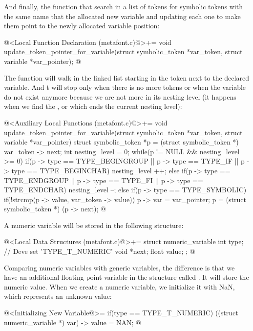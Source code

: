 And finally, the function that search in a list of tokens for symbolic
tokens with the same name that the allocated new variable and updating
each one to make them point to the newly allocated variable position:

\iniciocodigo
@<Local Function Declaration (metafont.c)@>+=
void update_token_pointer_for_variable(struct symbolic_token *var_token,
                                      struct variable *var_pointer);
@
\fimcodigo

The function will walk in the linked list starting in the token next
to the declared variable. And t will stop only when there is no more
tokens or when the variable do not exist anymore because we are not
more in its nesting level (it happens when we find
the ,  or 
which ends the current nesting level):

\iniciocodigo
@<Auxiliary Local Functions (metafont.c)@>+=
void update_token_pointer_for_variable(struct symbolic_token *var_token,
                                      struct variable *var_pointer){
  struct symbolic_token *p = (struct symbolic_token *) var_token -> next;
  int nesting_level = 0;
  while(p != NULL && nesting_level >= 0){
    if(p -> type == TYPE_BEGINGROUP || p -> type == TYPE_IF ||
       p -> type == TYPE_BEGINCHAR)
      nesting_level ++;
    else if(p -> type == TYPE_ENDGROUP || p -> type == TYPE_FI ||
            p -> type == TYPE_ENDCHAR)
      nesting_level --;
    else if(p -> type == TYPE_SYMBOLIC){
      if(!strcmp(p -> value, var_token -> value)){
        p -> var = var_pointer;
      }
    }
    p = (struct symbolic_token *) (p -> next);
  }
}
@
\fimcodigo


A numeric variable will be stored in the following structure:

\iniciocodigo
@<Local Data Structures (metafont.c)@>+=
struct numeric_variable{
  int type; // Deve set 'TYPE_T_NUMERIC'
  void *next;
  float value;
};
@
\fimcodigo

Comparing numeric variables with generic variables, the difference is
that we have an additional floating point variable in the structure
called . It will store the numeric value. When we
create a numeric variable, we initialize it with NaN, which represents
an unknown value:

\iniciocodigo
@<Initializing New Variable@>=
if(type == TYPE_T_NUMERIC){
  ((struct numeric_variable *) var) -> value = NAN;
}
@
\fimcodigo

